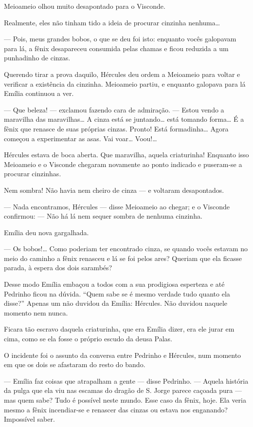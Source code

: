 Meioameio olhou muito desapontado para o Visconde.

Realmente, eles não tinham tido a ideia de procurar cinzinha
nenhuma\ldots{}

--- Pois, meus grandes bobos, o que se deu foi isto: enquanto vocês
galopavam para lá, a fênix desapareceu consumida pelas chamas e ficou
reduzida a um punhadinho de cinzas.

Querendo tirar a prova daquilo, Hércules deu ordem a Meioameio para
voltar e verificar a existência da cinzinha. Meioameio partiu, e
enquanto galopava para lá Emília continuou a ver.

--- Que beleza! --- exclamou fazendo cara de admiração. --- Estou vendo
a maravilha das maravilhas\ldots{} A cinza está se juntando\ldots{} está
tomando forma\ldots{} É a fênix que renasce de suas próprias cinzas.
Pronto! Está formadinha\ldots{} Agora começou a experimentar as asas.
Vai voar\ldots{} Voou!\ldots{}

Hércules estava de boca aberta. Que maravilha, aquela criaturinha!
Enquanto isso Meioameio e o Visconde chegaram novamente ao ponto
indicado e puseram-se a procurar cinzinhas.

Nem sombra! Não havia nem cheiro de cinza --- e voltaram desapontados.

--- Nada encontramos, Hércules --- disse Meioameio ao chegar; e o
Visconde confirmou: --- Não há lá nem sequer sombra de nenhuma cinzinha.

Emília deu nova gargalhada.

--- Os bobos!\ldots{} Como poderiam ter encontrado cinza, se quando
vocês estavam no meio do caminho a fênix renasceu e lá se foi pelos
ares? Queriam que ela ficasse parada, à espera dos dois sarambés?

Desse modo Emília embaçou a todos com a sua prodigiosa esperteza e até
Pedrinho ficou na dúvida. ``Quem sabe se é mesmo verdade tudo quanto ela
disse?'' Apenas um não duvidou da Emília: Hércules. Não duvidou naquele
momento nem nunca.

Ficara tão escravo daquela criaturinha, que era Emília dizer, era ele
jurar em cima, como se ela fosse o próprio escudo da deusa Palas.

O incidente foi o assunto da conversa entre Pedrinho e Hércules, num
momento em que os dois se afastaram do resto do bando.

--- Emília faz coisas que atrapalham a gente --- disse Pedrinho. ---
Aquela história da pulga que ela viu nas escamas do dragão de S. Jorge
parece caçoada pura --- mas quem sabe? Tudo é possível neste mundo. Esse
caso da fênix, hoje. Ela veria mesmo a fênix incendiar-se e renascer das
cinzas ou estava nos enganando? Impossível saber.

